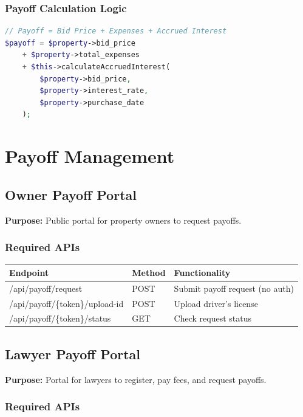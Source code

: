 \documentclass[11pt,a4paper]{article}
\begin{document}
\subsubsection{Payoff Calculation Logic}
\begin{lstlisting}[language=php]
// Payoff = Bid Price + Expenses + Accrued Interest
$payoff = $property->bid_price 
    + $property->total_expenses 
    + $this->calculateAccruedInterest(
        $property->bid_price,
        $property->interest_rate,
        $property->purchase_date
    );
\end{lstlisting}

\newpage

\section{Payoff Management}

\subsection{Owner Payoff Portal}

\textbf{Purpose:} Public portal for property owners to request payoffs.

\subsubsection{Required APIs}

\begin{longtable}{|p{5cm}|p{2cm}|p{6cm}|}
\hline
\textbf{Endpoint} & \textbf{Method} & \textbf{Functionality} \\
\hline
/api/payoff/request & POST & Submit payoff request (no auth) \\
/api/payoff/\{token\}/upload-id & POST & Upload driver's license \\
/api/payoff/\{token\}/status & GET & Check request status \\
\hline
\end{longtable}

\subsection{Lawyer Payoff Portal}

\textbf{Purpose:} Portal for lawyers to register, pay fees, and request payoffs.

\subsubsection{Required APIs}
\end{document}
